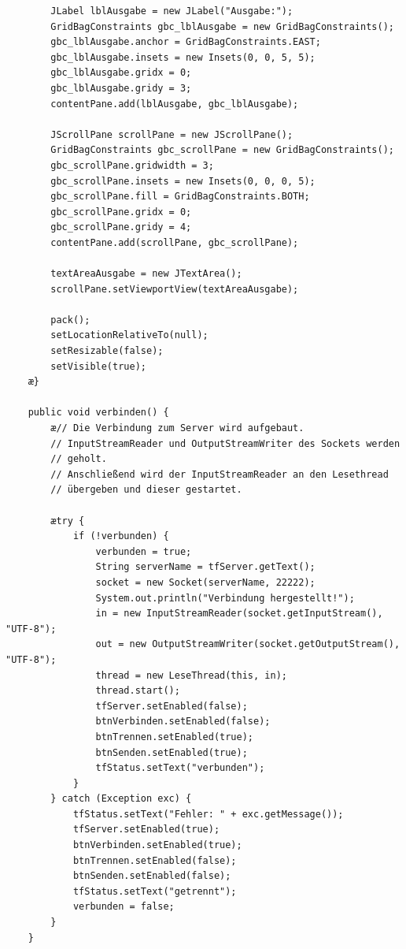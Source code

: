 \begin{lstlisting}
        JLabel lblAusgabe = new JLabel("Ausgabe:");
        GridBagConstraints gbc_lblAusgabe = new GridBagConstraints();
        gbc_lblAusgabe.anchor = GridBagConstraints.EAST;
        gbc_lblAusgabe.insets = new Insets(0, 0, 5, 5);
        gbc_lblAusgabe.gridx = 0;
        gbc_lblAusgabe.gridy = 3;
        contentPane.add(lblAusgabe, gbc_lblAusgabe);

        JScrollPane scrollPane = new JScrollPane();
        GridBagConstraints gbc_scrollPane = new GridBagConstraints();
        gbc_scrollPane.gridwidth = 3;
        gbc_scrollPane.insets = new Insets(0, 0, 0, 5);
        gbc_scrollPane.fill = GridBagConstraints.BOTH;
        gbc_scrollPane.gridx = 0;
        gbc_scrollPane.gridy = 4;
        contentPane.add(scrollPane, gbc_scrollPane);

        textAreaAusgabe = new JTextArea();
        scrollPane.setViewportView(textAreaAusgabe);

        pack();
        setLocationRelativeTo(null);
        setResizable(false);
        setVisible(true);
    æ}

    public void verbinden() {
        æ// Die Verbindung zum Server wird aufgebaut.
        // InputStreamReader und OutputStreamWriter des Sockets werden
        // geholt.
        // Anschließend wird der InputStreamReader an den Lesethread
        // übergeben und dieser gestartet.

        ætry {
            if (!verbunden) {
                verbunden = true;
                String serverName = tfServer.getText();
                socket = new Socket(serverName, 22222);
                System.out.println("Verbindung hergestellt!");
                in = new InputStreamReader(socket.getInputStream(), "UTF-8");
                out = new OutputStreamWriter(socket.getOutputStream(), "UTF-8");
                thread = new LeseThread(this, in);
                thread.start();
                tfServer.setEnabled(false);
                btnVerbinden.setEnabled(false);
                btnTrennen.setEnabled(true);
                btnSenden.setEnabled(true);
                tfStatus.setText("verbunden");
            }
        } catch (Exception exc) {
            tfStatus.setText("Fehler: " + exc.getMessage());
            tfServer.setEnabled(true);
            btnVerbinden.setEnabled(true);
            btnTrennen.setEnabled(false);
            btnSenden.setEnabled(false);
            tfStatus.setText("getrennt");
            verbunden = false;
        }
    }


\end{lstlisting}
